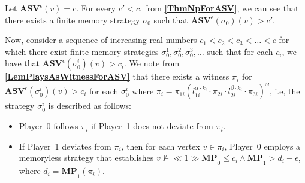 Let $\mathbf{ASV}^{\epsilon}(v) = c$.
For every $c' < c$, from \textbf{\cref{ThmNpForASV}}, we can see that there exists a finite memory strategy $\sigma_0$ such that $\mathbf{ASV}^{\epsilon}(\sigma_0)(v) > c'$.


Now, consider a sequence of increasing real numbers $c_1 < c_2 < c_3 < \dotsc < c$ for which there exist finite memory strategies $\sigma_0^{1}, \sigma_0^{2}, \sigma_0^{3}, \dotsc$ such that for each $c_i$, we have that $ \mathbf{ASV}^{\epsilon}(\sigma_0^i)(v) > c_i$.
We note from \textbf{\cref{LemPlaysAsWitnessForASV}} that there exists a witness $\pi_i$ for $ \mathbf{ASV}^{\epsilon}(\sigma_0^i)(v) > c_i$ for each $\sigma_0^i$ where $\pi_i= \pi_{1i}(l^{\alpha \cdot k_i}_{1i} \cdot \pi_{2i} \cdot l^{\beta \cdot k_i}_{2i} \cdot \pi_{3i})^{\omega}$, i.e, the strategy $\sigma_0^i$ is described as follows:
\begin{itemize}
    \item Player~0 follows $\pi_i$ if Player~1 does not deviate from $\pi_i$.
    \item If Player~1 deviates from $\pi_i$, then for each vertex $v \in \pi_i$, Player~0 employs a memoryless strategy that establishes $v \nvDash \ll 1 \gg \underline{\mathbf{MP}}_0 \leqslant c_i \land \underline{\mathbf{MP}}_1 > d_i - \epsilon$, where $d_i = \underline{\mathbf{MP}}_1(\pi_i)$.
\end{itemize}

